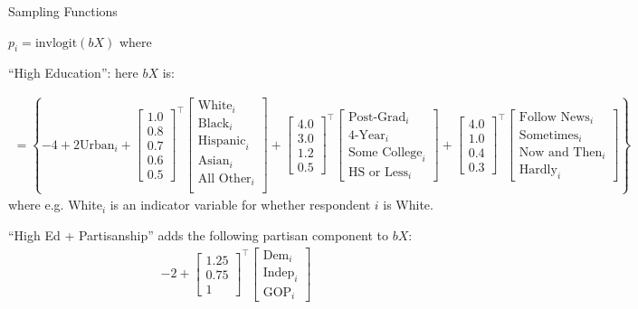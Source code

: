 \documentclass[ignorenonframetext, 10pt, aspectratio=169]{beamer}
\begin{document}
\begin{frame}
{Sampling Functions}

\(p_i = \text{invlogit}(bX)\) where

\bigskip

``High Education'': here \(bX\) is:

\small
\begin{align*}
 = \left\{-4 + 2\text{Urban}_i + \begin{bmatrix}1.0\\0.8 \\0.7\\ 0.6\\ 0.5\end{bmatrix}^\top\begin{bmatrix}\text{White}_i\\\text{Black}_i\\\text{Hispanic}_i\\\text{Asian}_i\\\text{All Other}_i\\\end{bmatrix} +
\begin{bmatrix}4.0\\3.0\\1.2\\0.5\end{bmatrix}^\top\begin{bmatrix}\text{Post-Grad}_i\\\text{4-Year}_i\\\text{Some College}_i\\\text{HS or Less}_i\end{bmatrix}  +
\begin{bmatrix}4.0\\1.0\\ 0.4\\ 0.3\end{bmatrix}^\top\begin{bmatrix}\text{Follow News}_i\\\text{Sometimes}_i\\\text{Now and Then}_i\\\text{Hardly}_i\end{bmatrix}\right\}
\end{align*}
\normalsize
where e.g. White$_{i}$ is an indicator variable for whether respondent \(i\) is White.

\bigskip


``High Ed + Partisanship'' adds the following partisan component to \(bX\):
\small
\begin{align*}
-2 + \begin{bmatrix}1.25\\0.75\\1\end{bmatrix}^\top\begin{bmatrix}\text{Dem}_{i}\\\text{Indep}_i\\\text{GOP}_i\end{bmatrix}
\end{align*}
\end{frame}
\end{document}
